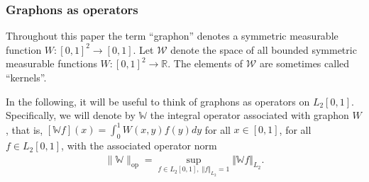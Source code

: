 \documentclass[11pt]{article}
\newcommand{\bA}{\bm{A}}
\newcommand{\bQ}{\bm{Q}}
\newcommand{\opnorm}[1]{\|#1\|_{\mathrm{op}}}
\newcommand{\bbW}{\mathbb{W}}
\newcommand{\<}{\langle}
\renewcommand{\>}{\rangle}
\theoremstyle{plain}
\theoremstyle{definition}
\theoremstyle{remark}
\begin{document}


\subsubsection*{Graphons as operators}
Throughout this paper the term ``graphon'' denotes a symmetric measurable function  $W : [0,1]^2 \rightarrow [0,1]$. 
Let $\mathcal{W}$ denote the space of all bounded symmetric measurable functions $W : [0,1]^2 \rightarrow \mathbb{R}$. The elements of $\mathcal{W}$ are sometimes called ``kernels''. 

In the following, it will be useful to  think of graphons as operators on $L_2[0,1]$. Specifically,
we will denote by $\bbW$  the integral operator associated with graphon $W$, that is, 
$[\bbW f](x)= \int_0^1 W(x, y) f(y) dy$ for all $x \in [0,1]$, for all $f \in L_2[0,1]$,
with the associated operator norm 
\begin{align*}
	\opnorm{\bbW} = \sup_{f \in L_2[0,1], \; \Vert f \Vert_{L_2} = 1} \Vert \bbW f \Vert_{L_2}. 
\end{align*}
\end{document}
